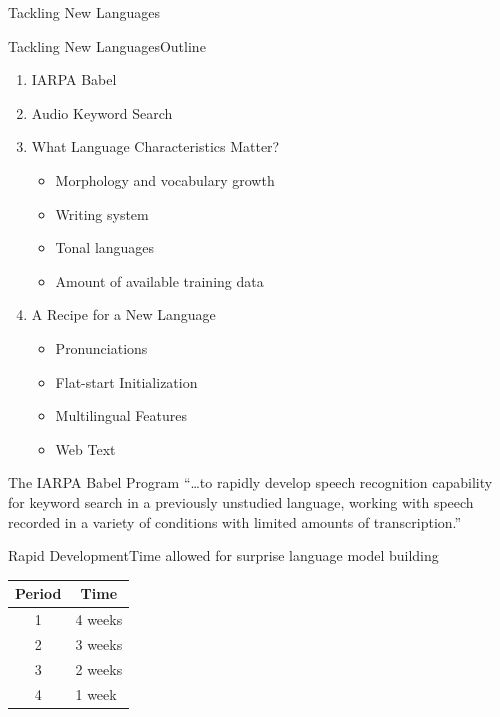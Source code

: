 \begin{frame}
  \begin{center}
    {\color{Maroon}\Huge Tackling New Languages}
  \end{center}
\end{frame}

\begin{frame}{Tackling New Languages}{Outline}
  \begin{enumerate}
  \item IARPA Babel
  \item Audio Keyword Search
  \item What Language Characteristics Matter?
    \begin{itemize}
    \item Morphology and vocabulary growth
    \item Writing system
    \item Tonal languages
    \item Amount of available training data
    \end{itemize}
  \item A Recipe for a New Language
    \begin{itemize}
    \item Pronunciations
    \item Flat-start Initialization
    \item Multilingual Features
    \item Web Text
    \end{itemize}
  \end{enumerate}
\end{frame}

\begin{frame}{The IARPA Babel Program}{}
  \Large{``\ldots to \alert{rapidly develop} speech recognition
    capability for keyword search in a previously unstudied
    language, working with speech recorded in a variety of
    conditions with limited amounts of transcription.''}\par
\end{frame}

\begin{frame}{Rapid Development}{Time allowed for surprise language model building}
  \begin{center}
    \begin{tabular}{@{}cl@{}} \toprule
      {\bf Period} & \multicolumn{1}{c}{\bf Time} \\ \midrule
      1 & 4 weeks \\
      2 & 3 weeks \\
      3 & 2 weeks \\
      4 & 1 week  \\ \bottomrule
    \end{tabular}
  \end{center}
\end{frame}

